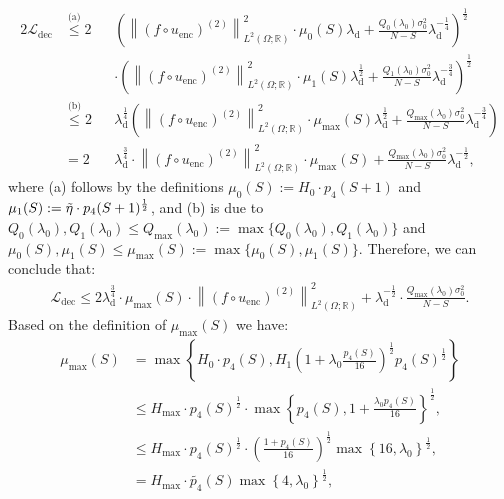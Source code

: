 \documentclass{article}
\def\encs{u_\textrm{enc}}
\def\declamb{\lambda_\textrm{d}}
\def\ldec{\mathcal{L}_\textrm{dec}}
\newcommand{\norm}[1]{\left\lVert#1\right\rVert}
\newcommand{\lp}[1]{{L}^{#1}\left(\Omega; \mathbb{R}\right)}
\newcommand{\lec}[2]{\stackrel{\text{#1}}{#2}}
\begin{document}
\begin{alignat}{2}
    \ldec &\lec{(a)}{\leqslant} 2&&\left(\norm{(f\circ\encs)^{(2)}}^2_{\lp{2}}\cdot \mu_{0}(S)\declamb + \frac{Q_0(\lambda_0)\sigma_0^2}{N-S}\declamb^{-\frac{1}{4}} \right)^{\frac{1}{2}} \nonumber \\ & &&\cdot\left(\norm{(f\circ\encs)^{(2)}}^2_{\lp{2}}\cdot \mu_{1}(S)\declamb^{\frac{1}{2}} + \frac{Q_1(\lambda_0)\sigma_0^2}{N-S}\declamb^{-\frac{3}{4}} \right)^{\frac{1}{2}} \nonumber \\
    &\lec{(b)}{\leqslant} 2&& 
    \declamb^\frac{1}{4} \left(\norm{(f\circ\encs)^{(2)}}^2_{\lp{2}}\cdot\mu_{\textrm{max}}(S)\declamb^{\frac{1}{2}} +\frac{Q_{\textrm{max}}(\lambda_0)\sigma_0^2}{N-S}\declamb^{-\frac{3}{4}}\right) \nonumber \\
    &\lec{}{=} 2 &&\declamb^{\frac{3}{4}}\cdot \norm{(f\circ\encs)^{(2)}}^2_{\lp{2}}\cdot\mu_{\textrm{max}}(S) +\frac{Q_{\textrm{max}}(\lambda_0)\sigma_0^2}{N-S}\declamb^{-\frac{1}{2}},
\end{alignat}
where (a) follows by the definitions $\mu_0(S) := H_0\cdot p_4(S+1)$ and $\mu_1(S) := \Tilde{\eta}\cdot p_4(S+1)^{\frac{1}{2}}$, and (b) is due to $Q_0(\lambda_0), Q_1(\lambda_0) \leqslant Q_{\textrm{max}}(\lambda_0):=\max\{Q_0(\lambda_0), Q_1(\lambda_0)\}$ and $\mu_0(S), \mu_1(S) \leqslant \mu_{\textrm{max}}(S):=\max\{\mu_0(S), \mu_1(S)\}$. Therefore, we can conclude that:
\begin{align}\label{eq:dec_upper_final}
    \ldec \leqslant 2\declamb^{\frac{3}{4}}\cdot \mu_{\textrm{max}}(S) \cdot \norm{(f\circ\encs)^{(2)}}^2_{\lp{2}} + \declamb^{-\frac{1}{2}}\cdot\frac{Q_{\textrm{max}}(\lambda_0)\sigma_0^2}{N-S}.
\end{align}
Based on the definition of $\mu_{\textrm{max}}(S)$ we have:
\begin{align}
    \mu_{\textrm{max}}(S) &=\max\left\{H_0\cdot p_4(S), H_1\left(1 + \lambda_0\frac{p_4(S)}{16}\right)^{\frac{1}{2}}p_4(S)^\frac{1}{2}\right\} \nonumber \\ 
    &\leqslant H_{\textrm{max}}\cdot p_4(S)^\frac{1}{2} \cdot \max \left\{ p_4(S), 1 + \frac{\lambda_0p_4(S)}{16}\right\}^\frac{1}{2}, \nonumber \\ 
    &\leqslant H_{\textrm{max}}\cdot p_4(S)^\frac{1}{2} \cdot \left(\frac{1+p_4(S)}{16}\right)^\frac{1}{2} \max \left\{ 16, \lambda_0\right\}^\frac{1}{2}, \nonumber \\ 
    &= H_{\textrm{max}}\cdot \widetilde{p_4}(S)\max \left\{4, \lambda_0\right\}^\frac{1}{2}, 
\end{align}
\end{document}
